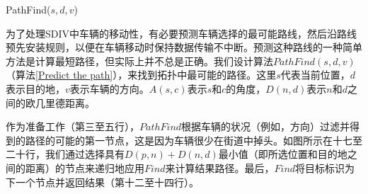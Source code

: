 \documentclass{ctexart}
\begin{document}
\begin{algorithm}[t]
\caption{PathFind($s,d,v$)}
\label{Algorithm 2}
\begin{algorithmic}[1]

\end{algorithmic}
\vspace{-0.06in}
\end{algorithm}

为了处理SDIV中车辆的移动性，有必要预测车辆选择的最可能路线，然后沿路线预先安装规则，以便在车辆移动时保持数据传输不中断。预测这种路线的一种简单方法是计算最短路径，但实际上并不总是正确。我们设计算法$PathFind(s,d,v)$（算法\ref{Predict the path}），来找到拓扑中最可能的路径。这里$s$代表当前位置，$d$表示目的地，$v$表示车辆的方向。$ A(s,c)$表示$s$和$c$的角度，$D(n,d)$表示$n$和$d$之间的欧几里德距离。



作为准备工作（第三至五行），$PathFind$根据车辆的状况（例如，方向）过滤并得到的路径的可能的第一节点，这是因为车辆很少在街道中掉头。如图所示在十七至二十行，我们通过选择具有$D(p,n)+D(n,d)$最小值（即所选位置和目的地之间的距离）的节点来递归地应用$Find$来计算结果路径。最后，$Find$将目标标识为下一个节点并返回结果（第十二至十四行）。
\end{document}

